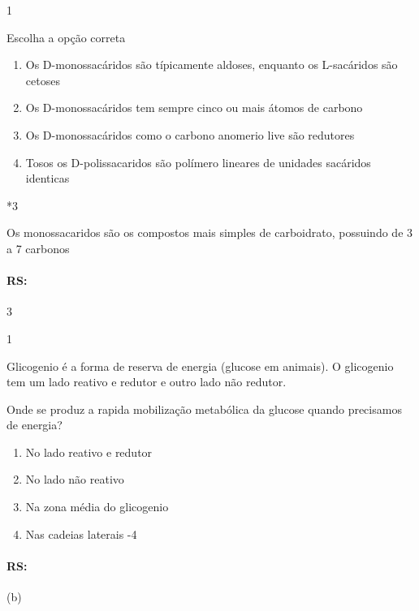 \documentclass[\mainfilename]{subfiles}
\begin{document}
\setcounter{question}{6}
\begin{questionBox}1{}
    
    Escolha a opção correta
    \begin{enumerate}
        \item Os D-monossacáridos são típicamente aldoses, enquanto os L-sacáridos são cetoses
        \item Os D-monossacáridos tem sempre cinco ou mais átomos de carbono
        \item Os D-monossacáridos como o carbono anomerio live são redutores
        \item Tosos os D-polissacaridos são polímero lineares de unidades sacáridos identicas
    \end{enumerate}

    \begin{questionBox}*3{}
        
        Os monossacaridos são os compostos mais simples de carboidrato, possuindo de 3 a 7 carbonos
    \end{questionBox}

    \paragraph{RS:} 3
    
\end{questionBox}

\setcounter{question}{9}
\begin{questionBox}1{}
    
    Glicogenio é a forma de reserva de energia (glucose em animais). O glicogenio tem um lado reativo e redutor e outro lado não redutor.
    
    
    Onde se produz a rapida mobilização metabólica da glucose quando precisamos de energia?
    \begin{enumerate}[label=(\alph*)]
        \item No lado reativo e redutor
        \item No lado não reativo
        \item Na zona média do glicogenio
        \item Nas cadeias laterais -4
    \end{enumerate}

    \paragraph{RS:} (b)
    
\end{questionBox}
\end{document}
